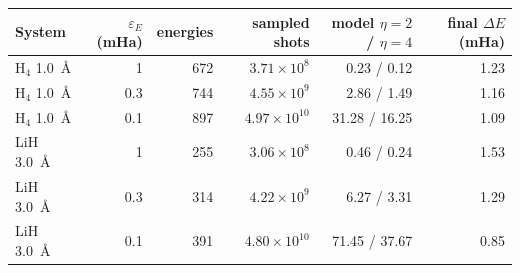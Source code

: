 \begin{tabular}{@{}lrrrrr@{}}
\toprule
System & $\varepsilon_E$ (mHa) & energies & sampled shots & model $\eta=2$ / $\eta=4$ & final $\Delta E$ (mHa) \\
\midrule
H$_4$ 1.0~\AA & 1 & 672 & $3.71\times10^{8}$ & 0.23 / 0.12 & 1.23 \\
H$_4$ 1.0~\AA & 0.3 & 744 & $4.55\times10^{9}$ & 2.86 / 1.49 & 1.16 \\
H$_4$ 1.0~\AA & 0.1 & 897 & $4.97\times10^{10}$ & 31.28 / 16.25 & 1.09 \\
LiH 3.0~\AA & 1 & 255 & $3.06\times10^{8}$ & 0.46 / 0.24 & 1.53 \\
LiH 3.0~\AA & 0.3 & 314 & $4.22\times10^{9}$ & 6.27 / 3.31 & 1.29 \\
LiH 3.0~\AA & 0.1 & 391 & $4.80\times10^{10}$ & 71.45 / 37.67 & 0.85 \\
\bottomrule
\end{tabular}
